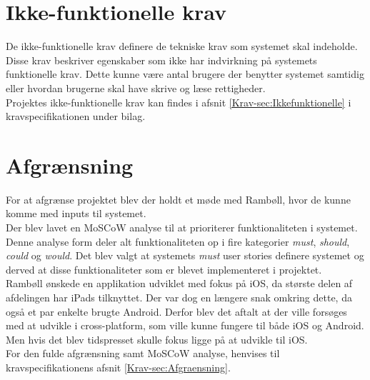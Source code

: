 \section{Ikke-funktionelle krav}
De ikke-funktionelle krav definere de tekniske krav som systemet skal indeholde. Disse krav beskriver egenskaber som ikke har indvirkning på systemets funktionelle krav. Dette kunne være antal brugere der benytter systemet samtidig eller hvordan brugerne skal have skrive og læse rettigheder. \\
Projektes ikke-funktionelle krav kan findes i afsnit \ref{Krav-sec:Ikkefunktionelle} i kravspecifikationen under bilag. \\


\section{Afgrænsning}
For at afgrænse projektet blev der holdt et møde med Rambøll, hvor de kunne komme med inputs til systemet. \\
Der blev lavet en MoSCoW analyse til at prioriterer funktionaliteten i systemet. Denne analyse form deler alt funktionaliteten op i fire kategorier \emph{must}, \emph{should}, \emph{could} og \emph{would}.
Det blev valgt at systemets \emph{must} user stories definere systemet og derved at disse funktionaliteter som er blevet implementeret i projektet. \\
Rambøll ønskede en applikation udviklet med fokus på iOS, da største delen af afdelingen har iPads tilknyttet. Der var dog en længere snak omkring dette, da også et par enkelte brugte Android. Derfor blev det aftalt at der ville forsøges med at udvikle i cross-platform, som ville kunne fungere til både iOS og Android. Men hvis det blev tidspresset skulle fokus ligge på at udvikle til iOS. \\
For den fulde afgrænsning samt MoSCoW analyse, henvises til kravspecifikationens afsnit \ref{Krav-sec:Afgraensning}.
	